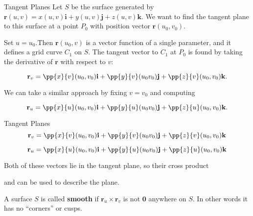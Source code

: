 \documentclass[11pt,english,
handout
]{beamer}
\begin{document}
\begin{frame}[t]{Tangent Planes}
\small
Let $S$ be the surface generated by $\mathbf{r}(u,v)=x(u,v)\mathbf{i}+y(u,v)\mathbf{j}+z(u,v)\mathbf{k}$. \pause We want to find the tangent plane to this surface at a point $P_0$ with position vector $\mathbf{r}(u_0,v_0)$.\pause 

\lspace
Set $u=u_0$.Then $\mathbf{r}(u_0,v)$ is a vector function of a single parameter, and it defines a grid curve $C_1$ on $S$. \pause The tangent vector to $C_1$ at $P_0$ is found by taking the derivative of $\mathbf{r}$ with respect to $v$:

\[
\mathbf{r}_v=\pp{x}{v}(u_0,v_0)\mathbf{i}+\pp{y}{v}(u_0v_0)\mathbf{j}+\pp{z}{v}(u_0,v_0)\mathbf{k}.
\]\pause

\vspace{2mm}
We can take a similar approach by fixing $v=v_0$ and computing

\[
\mathbf{r}_u=\pp{x}{u}(u_0,v_0)\mathbf{i}+\pp{y}{u}(u_0v_0)\mathbf{j}+\pp{z}{u}(u_0,v_0)\mathbf{k}.
\]
\end{frame}










\begin{frame}[t]{Tangent Planes}
\small
\[
\mathbf{r}_v=\pp{x}{v}(u_0,v_0)\mathbf{i}+\pp{y}{v}(u_0v_0)\mathbf{j}+\pp{z}{v}(u_0,v_0)\mathbf{k}
\]

\[
\mathbf{r}_u=\pp{x}{u}(u_0,v_0)\mathbf{i}+\pp{y}{u}(u_0v_0)\mathbf{j}+\pp{z}{u}(u_0,v_0)\mathbf{k}
\]

\lspace
Both of these vectors lie in the tangent plane, so their cross product 
\begin{center}
\end{center}
and can be used to describe the plane.\pause

\vspace{2mm}
\begin{definition}
A surface $S$ is called \textbf{smooth} if $\mathbf{r}_u\times\mathbf{r}_v$ is not $\mathbf{0}$ anywhere on $S$. In other words it has no ``corners'' or cusps.
\end{definition}
\end{frame}
\end{document}
